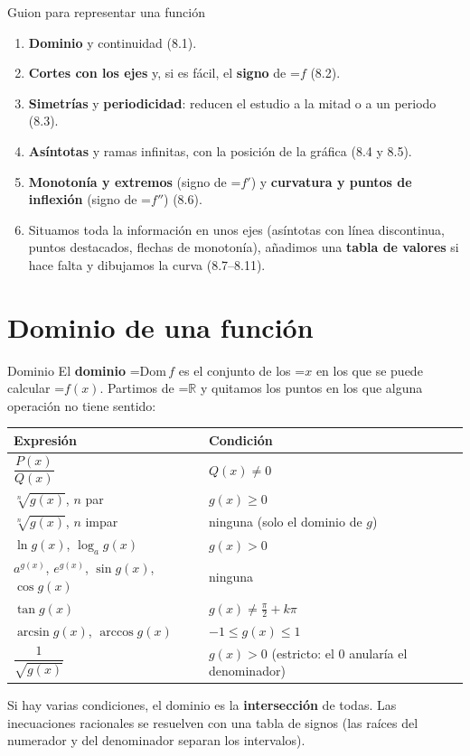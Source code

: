 \documentclass[11pt,a4paper]{article}
\newcommand{\fmm}[1]{\setbox0=\hbox{$#1$}\ifdim\wd0>\linewidth\fmdisp{#1}\else\mbox{\box0}\fi}
\newcommand{\fmdisp}[1]{\[\setbox2=\hbox{$\displaystyle #1$}\ifdim\wd2>\linewidth\resizebox{\linewidth}{!}{\box2}\else\box2\fi\]}
\begin{document}
\begin{fmdef}{Guion para representar una función}
\begin{enumerate}
\item \textbf{Dominio} y continuidad (8.1).
\item \textbf{Cortes con los ejes} y, si es fácil, el \textbf{signo} de \fmm{f} (8.2).
\item \textbf{Simetrías} y \textbf{periodicidad}: reducen el estudio a la mitad o a un periodo (8.3).
\item \textbf{Asíntotas} y ramas infinitas, con la posición de la gráfica (8.4 y 8.5).
\item \textbf{Monotonía y extremos} (signo de \fmm{f'}) y \textbf{curvatura y puntos de inflexión} (signo de \fmm{f''}) (8.6).
\item Situamos toda la información en unos ejes (asíntotas con línea discontinua, puntos destacados, flechas de monotonía), añadimos una \textbf{tabla de valores} si hace falta y dibujamos la curva (8.7--8.11).
\end{enumerate}
\end{fmdef}

\section{Dominio de una función}\hypertarget{sec1}{}

\begin{fmdef}{Dominio}
El \textbf{dominio} \fmm{\mathrm{Dom}\,f} es el conjunto de los \fmm{x} en los que se puede calcular \fmm{f(x)}. Partimos de \fmm{\mathbb R} y quitamos los puntos en los que alguna operación no tiene sentido:

\begin{center}\renewcommand{\arraystretch}{1.5}\small\begin{tabularx}{\linewidth}{>{\raggedright\arraybackslash}p{6.2cm}>{\raggedright\arraybackslash}X}\toprule
\textbf{Expresión} & \textbf{Condición}\\\midrule
$\dfrac{P(x)}{Q(x)}$ & $Q(x)\neq0$\\[3pt]
$\sqrt[n]{g(x)}$, $n$ par & $g(x)\geq0$\\[3pt]
$\sqrt[n]{g(x)}$, $n$ impar & ninguna (solo el dominio de $g$)\\[3pt]
$\ln g(x)$, $\log_a g(x)$ & $g(x)\gt0$\\[3pt]
$a^{g(x)}$, $e^{g(x)}$, $\sin g(x)$, $\cos g(x)$ & ninguna\\[3pt]
$\tan g(x)$ & $g(x)\neq\frac\pi2+k\pi$\\[3pt]
$\arcsin g(x)$, $\arccos g(x)$ & $-1\leq g(x)\leq1$\\[3pt]
$\dfrac{1}{\sqrt{g(x)}}$ & $g(x)\gt0$ (estricto: el 0 anularía el denominador)\\[5pt]
\bottomrule\end{tabularx}\end{center}

Si hay varias condiciones, el dominio es la \textbf{intersección} de todas. Las inecuaciones racionales se resuelven con una tabla de signos (las raíces del numerador y del denominador separan los intervalos).
\end{fmdef}
\end{document}

